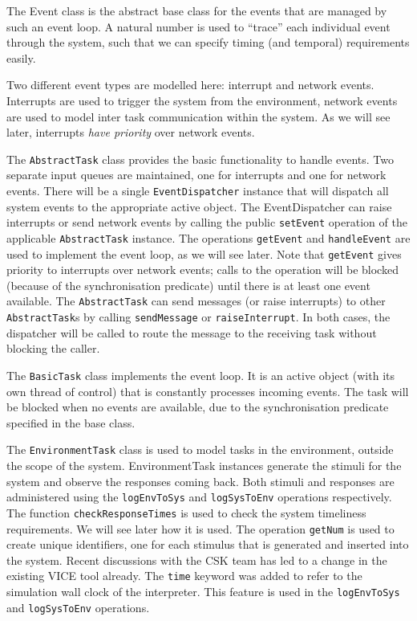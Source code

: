 The Event class is the abstract base class for the events that are managed
by such an event loop. A natural number is used to ``trace'' each individual
event through the system, such that we can specify timing (and temporal)
requirements easily.



Two different event types are modelled here: interrupt and network events.
Interrupts are used to trigger the system from the environment, network
events are used to model inter task communication within the system.
As we will see later, interrupts \textit{have priority} over network events.





The \verb+AbstractTask+ class provides the basic functionality to handle
events. Two separate input queues are maintained, one for interrupts and
one for network events. There will be a single \verb+EventDispatcher+
instance that will dispatch all system events to the appropriate active
object. The EventDispatcher can raise interrupts or send network events
by calling the public \verb+setEvent+ operation of the applicable
\verb+AbstractTask+ instance. The operations \verb+getEvent+ and 
\verb+handleEvent+ are used to implement the event loop, as we will
see later. Note that \verb+getEvent+ gives priority to interrupts over
network events; calls to the operation will be blocked (because of the
synchronisation predicate) until there is at least one event available.
The \verb+AbstractTask+ can send messages (or raise interrupts) to other
\verb+AbstractTask+s by calling \verb+sendMessage+ or \verb+raiseInterrupt+.
In both cases, the dispatcher will be called to route the message to the
receiving task without blocking the caller.



The \verb+BasicTask+ class implements the event loop. It is an active
object (with its own thread of control) that is constantly processes
incoming events. The task will be blocked when no events are available,
due to the synchronisation predicate specified in the base class.



The \verb+EnvironmentTask+ class is used to model tasks in the environment,
outside the scope of the system. EnvironmentTask instances generate the
stimuli for the system and observe the responses coming back. Both stimuli
and responses are administered using the \verb+logEnvToSys+ and 
\verb+logSysToEnv+ operations respectively. The function
\verb+checkResponseTimes+ is used to check the system timeliness
requirements. We will see later how it is used. The operation \verb+getNum+
is used to create unique identifiers, one for each stimulus that is
generated and inserted into the system. Recent discussions with the CSK
team has led to a change in the existing VICE tool already. The \verb+time+
keyword was added to refer to the simulation wall clock of the interpreter.
This feature is used in the \verb+logEnvToSys+ and \verb+logSysToEnv+
operations.

